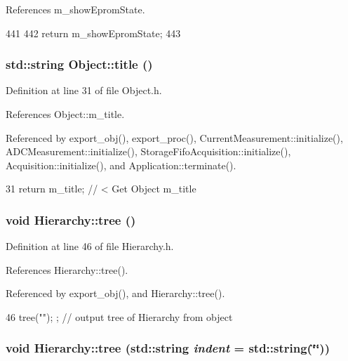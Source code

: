 References m\_\-showEpromState.


\begin{DoxyCode}
441                          {
442     return m_showEpromState;
443   }  
\end{DoxyCode}
\hypertarget{classObject_a73a0f1a41828fdd8303dd662446fb6c3}{
\subsubsection[{title}]{\setlength{\rightskip}{0pt plus 5cm}std::string Object::title ()}}
\label{classObject_a73a0f1a41828fdd8303dd662446fb6c3}


Definition at line 31 of file Object.h.

References Object::m\_\-title.

Referenced by export\_\-obj(), export\_\-proc(), CurrentMeasurement::initialize(), ADCMeasurement::initialize(), StorageFifoAcquisition::initialize(), Acquisition::initialize(), and Application::terminate().


\begin{DoxyCode}
31 { return m_title;      } // < Get Object m_title
\end{DoxyCode}
\hypertarget{classHierarchy_a594c294c5f60c230e106d522ed008212}{
\subsubsection[{tree}]{\setlength{\rightskip}{0pt plus 5cm}void Hierarchy::tree ()}}
\label{classHierarchy_a594c294c5f60c230e106d522ed008212}


Definition at line 46 of file Hierarchy.h.

References Hierarchy::tree().

Referenced by export\_\-obj(), and Hierarchy::tree().


\begin{DoxyCode}
46 { tree(""); };                     // output tree of Hierarchy from object
\end{DoxyCode}
\hypertarget{classHierarchy_a76e914b9a677a22a82deb74d892bf261}{
\subsubsection[{tree}]{\setlength{\rightskip}{0pt plus 5cm}void Hierarchy::tree (std::string {\em indent} = {\ttfamily std::string(\char`\"{}\char`\"{})})}}
\label{classHierarchy_a76e914b9a677a22a82deb74d892bf261}


